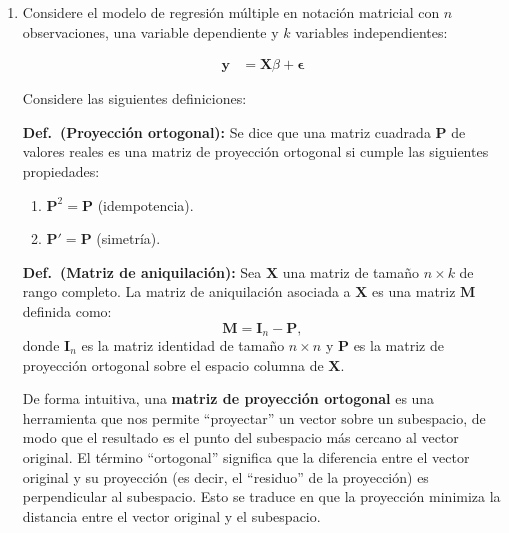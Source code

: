 \documentclass[a4paper, answers, addpoints, 11pt]{exam}
\begin{document}
\begin{enumerate}
    \item Considere el modelo de regresión múltiple en notación matricial con \(n\) observaciones, una variable dependiente y \(k\) variables independientes:
    
    \begin{align}\label{EQ:modelInicial}
        \mathbf{y} &= \mathbf{X}\beta + \boldsymbol\epsilon
    \end{align}

    Considere las siguientes definiciones: \\ 
    
    \begin{mdframed}
        \textbf{Def.\ (Proyección ortogonal):} Se dice que una matriz cuadrada \( \mathbf{P} \) de valores reales es una matriz de proyección ortogonal si cumple las siguientes propiedades:
        \begin{enumerate}
            \item \( \mathbf{P}^2 = \mathbf{P} \) (idempotencia).
            \item \( \mathbf{P}' = \mathbf{P} \) (simetría).
        \end{enumerate}
     \end{mdframed}
    \vspace{1em}
    
    \begin{mdframed}
    \textbf{Def.\ (Matriz de aniquilación):} Sea \( \mathbf{X} \) una matriz de tamaño \( n \times k \) de rango completo. La matriz de aniquilación asociada a \( \mathbf{X} \) es una matriz \( \mathbf{M} \) definida como:
    \[
    \mathbf{M} = \mathbf{I}_n - \mathbf{P},
    \]
    donde \( \mathbf{I}_n \) es la matriz identidad de tamaño \( n \times n \) y \( \mathbf{P} \) es la matriz de proyección ortogonal sobre el espacio columna de \( \mathbf{X} \).
    \end{mdframed}
    \vspace{1em}
    
    De forma intuitiva, una \textbf{matriz de proyección ortogonal} es una herramienta que nos permite ``proyectar'' un vector sobre un subespacio, de modo que el resultado es el punto del subespacio más cercano al vector original. El término ``ortogonal'' significa que la diferencia entre el vector original y su proyección (es decir, el ``residuo'' de la proyección) es perpendicular al subespacio. Esto se traduce en que la proyección minimiza la distancia entre el vector original y el subespacio.
    

\end{enumerate}
\end{document}
